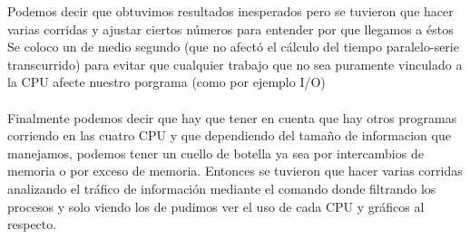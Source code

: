 Podemos decir que obtuvimos resultados inesperados pero se tuvieron que hacer
varias corridas y ajustar ciertos números para entender por que llegamos a
éstos\\
Se coloco un  de medio segundo (que no afectó el cálculo
del tiempo paralelo-serie transcurrido) para evitar que cualquier trabajo que no
sea puramente vinculado a la CPU afecte nuestro porgrama (como por ejemplo I/O) \\\\
Finalmente podemos decir que hay que tener en cuenta que hay otros programas
corriendo en las cuatro CPU y que dependiendo del tamaño de informacion que
manejamos, podemos tener un cuello de botella ya sea por intercambios de memoria
o por exceso de memoria.
Entonces se tuvieron que hacer varias corridas analizando el tráfico de
información mediante el comando  donde filtrando
los procesos y solo viendo los de  pudimos ver el uso de cada CPU
y gráficos al respecto.
